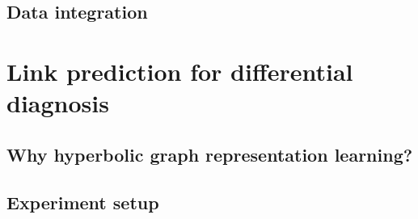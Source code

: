 \subsection{Data integration}



\section{Link prediction for differential diagnosis}\label{sec:linkPredictionDiffDiagnosis}

\subsection{Why hyperbolic graph representation learning?}

\subsection{Experiment setup}
